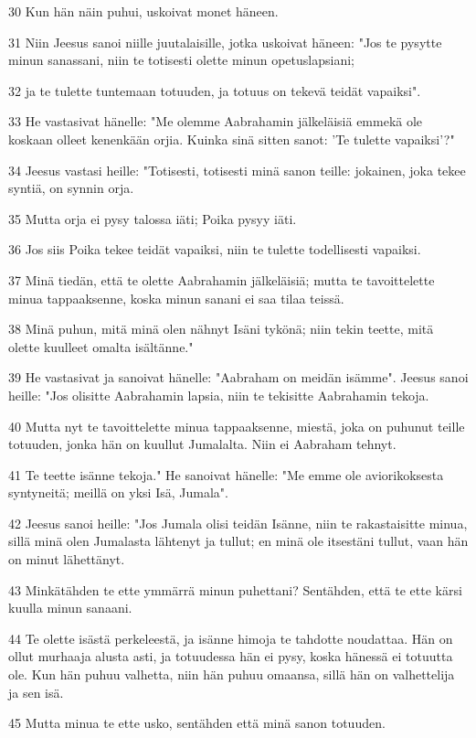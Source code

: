 \par 30 Kun hän näin puhui, uskoivat monet häneen.
\par 31 Niin Jeesus sanoi niille juutalaisille, jotka uskoivat häneen: "Jos te pysytte minun sanassani, niin te totisesti olette minun opetuslapsiani;
\par 32 ja te tulette tuntemaan totuuden, ja totuus on tekevä teidät vapaiksi".
\par 33 He vastasivat hänelle: "Me olemme Aabrahamin jälkeläisiä emmekä ole koskaan olleet kenenkään orjia. Kuinka sinä sitten sanot: 'Te tulette vapaiksi'?"
\par 34 Jeesus vastasi heille: "Totisesti, totisesti minä sanon teille: jokainen, joka tekee syntiä, on synnin orja.
\par 35 Mutta orja ei pysy talossa iäti; Poika pysyy iäti.
\par 36 Jos siis Poika tekee teidät vapaiksi, niin te tulette todellisesti vapaiksi.
\par 37 Minä tiedän, että te olette Aabrahamin jälkeläisiä; mutta te tavoittelette minua tappaaksenne, koska minun sanani ei saa tilaa teissä.
\par 38 Minä puhun, mitä minä olen nähnyt Isäni tykönä; niin tekin teette, mitä olette kuulleet omalta isältänne."
\par 39 He vastasivat ja sanoivat hänelle: "Aabraham on meidän isämme". Jeesus sanoi heille: "Jos olisitte Aabrahamin lapsia, niin te tekisitte Aabrahamin tekoja.
\par 40 Mutta nyt te tavoittelette minua tappaaksenne, miestä, joka on puhunut teille totuuden, jonka hän on kuullut Jumalalta. Niin ei Aabraham tehnyt.
\par 41 Te teette isänne tekoja." He sanoivat hänelle: "Me emme ole aviorikoksesta syntyneitä; meillä on yksi Isä, Jumala".
\par 42 Jeesus sanoi heille: "Jos Jumala olisi teidän Isänne, niin te rakastaisitte minua, sillä minä olen Jumalasta lähtenyt ja tullut; en minä ole itsestäni tullut, vaan hän on minut lähettänyt.
\par 43 Minkätähden te ette ymmärrä minun puhettani? Sentähden, että te ette kärsi kuulla minun sanaani.
\par 44 Te olette isästä perkeleestä, ja isänne himoja te tahdotte noudattaa. Hän on ollut murhaaja alusta asti, ja totuudessa hän ei pysy, koska hänessä ei totuutta ole. Kun hän puhuu valhetta, niin hän puhuu omaansa, sillä hän on valhettelija ja sen isä.
\par 45 Mutta minua te ette usko, sentähden että minä sanon totuuden.
